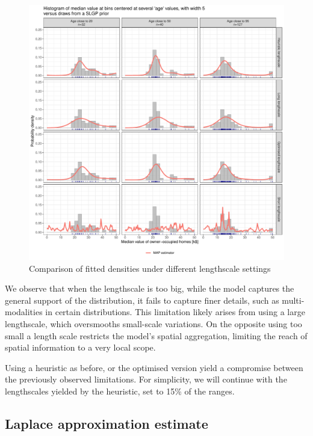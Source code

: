 \documentclass[
]{article}
\begin{document}
\begin{figure}[H]

{\centering \includegraphics{IntroductionSLGP_files/figure-latex/plotRibbonsLen2-1} 

}

\caption{Comparison of fitted densities under different lengthscale settings}\label{fig:plotRibbonsLen2}
\end{figure}

We observe that when the lengthscale is too big, while the model captures the general support of the distribution, it fails to capture finer details, such as multi-modalities in certain distributions. This limitation likely arises from using a large lengthscale, which oversmooths small-scale variations.
On the opposite using too small a length scale restricts the model's spatial aggregation, limiting the reach of spatial information to a very local scope.

Using a heuristic as before, or the optimised version yield a compromise between the previously observed limitations.
For simplicity, we will continue with the lengthscales yielded by the heuristic, set to 15\% of the ranges.

\subsection{Laplace approximation estimate}\label{laplace-approximation-estimate}
\end{document}
